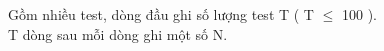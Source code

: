 Gồm nhiều test, dòng đầu ghi số lượng test T ( T $\le$ 100 ).   
\\   T dòng sau mỗi dòng ghi một số N.